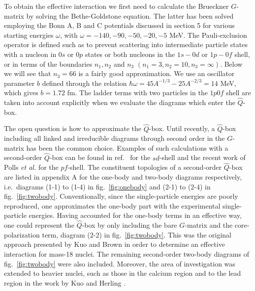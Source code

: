 To obtain the effective interaction we first need to
calculate the Brueckner $G$-matrix by solving the Bethe-Goldstone
equation. The latter
has been
solved employing the Bonn A, B and C potentials discussed
in section 5  for various starting energies $\omega$, with
$\omega=-140,-90,-50,-20,-5$ MeV. The Pauli-exclusion operator
is defined such as to prevent scattering into
intermediate
particle states with a nucleon in $0s$ or $0p$ states or both
nucleons in the $1s-0d$ or $1p-0f$ shell, or in terms of the
boundaries $n_1, n_2$ and $n_3$ $(n_1=3, n_2=10, n_3=\infty )$. Below we will
see that $n_3=66$ is a fairly good approximation.
We use an oscillator parameter $b$ defined through the
relation
$\hbar\omega = 45A^{-1/3} - 25A^{-2/3}= 14$ MeV, which gives $b=1.72$ fm.
The ladder terms with two particles in the $1p0f$
shell are taken into account explicitly when we evaluate the
diagrams which
enter the $\hat{Q}$-box.

The open question is how to approximate the $\hat{Q}$-box. Until
recently, a $\hat{Q}$-box including all linked and irreducible diagrams
through second order in the $G$-matrix has been the common choice.
Examples of such calculations with a second-order
$\hat{Q}$-box can be found in ref.\ \cite{skd83} for the $sd$-shell
and the recent work of Polls {\em et al.}
\cite{prm90} for the $pf$-shell.
The constituent topologies of a second-order $\hat{Q}$-box are listed
in appendix A for the one-body
and two-body diagrams respectively, i.e.\ diagrams (1-1) to (1-4)
in fig.\ \ref{fig:onebody} and (2-1) to (2-4) in fig.\ \ref{fig:twobody}.
Conventionally, since the single-particle energies are poorly reproduced, one
approximates the one-body part with the experimental
single-particle energies.
Having accounted for the one-body terms in an effective way,
one could represent the
$\hat{Q}$-box by only including the bare $G$-matrix and the
core-polarization term,
diagram (2-2) in fig.\ \ref{fig:twobody}.
This was the original approach presented by Kuo and Brown
\cite{kb66,kuo68} in order to
determine an effective interaction for mass-18 nuclei.
The remaining second-order
two-body diagrams of fig.\ \ref{fig:twobody} were
also included. Moreover,
the area of investigation was extended to heavier nuclei,
such as those in the calcium region \cite{kb68} and
to the lead region in the work
by Kuo and Herling \cite{hk72}.

